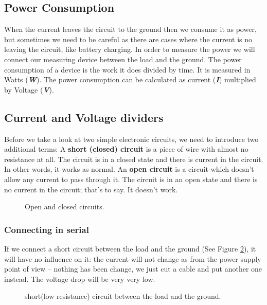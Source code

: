 \subsection{Power Consumption}

When the current leaves the circuit to the ground then we consume it as power,
but sometimes we need to be careful as there are cases where the current is no
leaving the circuit, like battery charging. In order to measure the power we
will connect our measuring device between the load and the ground. The power
consumption of a device is the work it does divided by time. It is measured in
Watts (\textbf{\textit{W}}). The power consumption can be calculated as current
(\textbf{\textit{I}}) multiplied by Voltage (\textbf{\textit{V}}).

\subsection{Current and Voltage dividers}

Before we take a look at two simple electronic circuits, we need to introduce
two additional terms: A \textbf{short (closed) circuit} is a piece of wire with
almost no resistance at all. The circuit is in a closed state and there is
current in the circuit. In other words, it works as normal. An \textbf{open
circuit} is a circuit which doesn't allow any current to pass through it. The
circuit is in an open state and there is no current in the circuit; that's to
say. It doesn't work.

\begin{figure}[!ht]
    \centering
    
    \caption{Open and closed circuits.} \label{fig:open_closed_circuits}
\end{figure}

\subsubsection{Connecting in serial}

If we connect a short circuit between the load and the ground (See Figure
\ref{fig:circuit1}), it will have no influence on it: the current will not
change as from the power supply point of view – nothing has been change, we just
cut a cable and put another one instead. The voltage drop will be very very low.

\begin{figure}[!ht]
    \centering
    
    \caption{short(low resistance) circuit between the load and the ground.} \label{fig:circuit1}
\end{figure}

